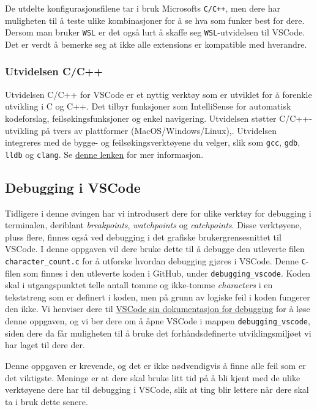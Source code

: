 De utdelte konfigurasjonsfilene tar i bruk Microsofts \verb|C/C++|, men dere har muligheten til å teste ulike kombinasjoner for å se hva som funker best for dere. Dersom man bruker \verb|WSL| er det også lurt å skaffe seg \verb|WSL|-utvidelsen til VSCode. Det er verdt å bemerke seg at ikke alle extensions er kompatible med hverandre.

\subsubsection{Utvidelsen C/C++}
Utvidelsen C/C++ for VSCode er et nyttig verktøy som er utviklet for å forenkle utvikling i C og C++. Det tilbyr funksjoner som IntelliSense for automatisk kodeforslag, feilsøkingsfunksjoner og enkel navigering. Utvidelsen støtter C/C++-utvikling på tvers av plattformer (MacOS/Windows/Linux),. Utvidelsen integreres med de bygge- og feilsøkingsverktøyene du velger, slik som \verb|gcc|, \verb|gdb|, \verb|lldb| og \verb|clang|. Se \href{https://code.visualstudio.com/docs/cpp/faq-cpp}{denne lenken} for mer informasjon.


\subsection{Debugging i VSCode}\label{sec:debugging}
Tidligere i denne øvingen har vi introdusert dere for ulike verktøy for debugging i terminalen, deriblant \textit{breakpoints}, \textit{watchpoints} og \textit{catchpoints}. Disse verktøyene, pluss flere, finnes også ved debugging i det grafiske brukergrensesnittet til VSCode. I denne oppgaven vil dere bruke dette til å debugge den utleverte filen \verb|character_count.c| for å utforske hvordan debugging gjøres i VSCode. Denne \verb|C|-filen som finnes i den utleverte koden i GitHub, under \verb|debugging_vscode|. Koden skal i utgangspunktet telle antall tomme og ikke-tomme \textit{characters} i en tekststreng som er definert i koden, men på grunn av logiske feil i koden fungerer den ikke. Vi henviser dere til \href{https://code.visualstudio.com/docs/editor/debugging}{VSCode sin dokumentasjon for debugging} for å løse denne oppgaven, og vi ber dere om å åpne VSCode i mappen \verb|debugging_vscode|, siden dere da får muligheten til å bruke det forhåndsdefinerte utviklingsmiljøet vi har laget til dere der.

Denne oppgaven er krevende, og det er ikke nødvendigvis å finne alle feil som er det viktigste. Meninge er at dere skal bruke litt tid på å bli kjent med de ulike verktøyene dere har til debugging i VSCode, slik at ting blir lettere når dere skal ta i bruk dette senere.